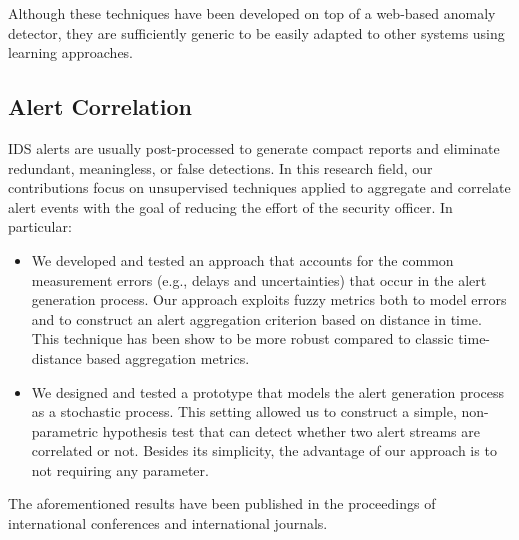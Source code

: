 Although these techniques have been developed on top of a web-based anomaly detector, they are sufficiently generic to be easily adapted to other systems using learning approaches.

\subsection{Alert Correlation} \ac{IDS} alerts are usually post-processed to generate compact reports and eliminate redundant, meaningless, or false detections. In this research field, our contributions focus on unsupervised techniques applied to aggregate and correlate alert events with the goal of reducing the effort of the security officer. In particular:

\begin{itemize}
\item We developed and tested an approach that accounts for the common measurement errors (e.g., delays and uncertainties) that occur in the alert generation process. Our approach exploits fuzzy metrics both to model errors and to construct an alert aggregation criterion based on distance in time. This technique has been show to be more robust compared to classic time-distance based aggregation metrics.
\item We designed and tested a prototype that models the alert generation process as a stochastic process. This setting allowed us to construct a simple, non-parametric hypothesis test that can detect whether two alert streams are correlated or not. Besides its simplicity, the advantage of our approach is to not requiring any parameter.
\end{itemize}

The aforementioned results have been published in the proceedings of international conferences and international journals.